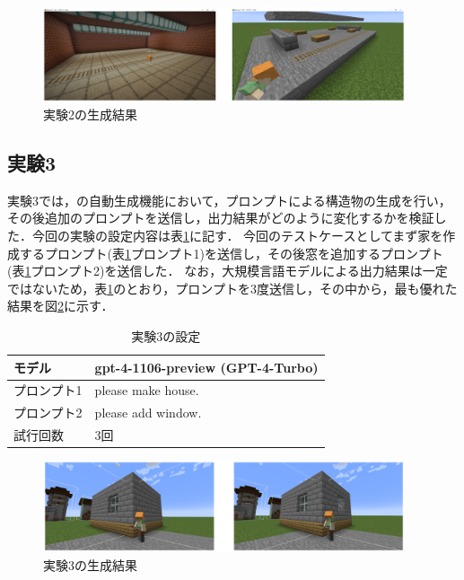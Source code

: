\begin{figure}[H]
    \centering
    \includegraphics[width=0.95\textwidth]{fig/train_station2.PNG}
    \caption{実験2の生成結果}
    \label{fig:station2}
\end{figure}

\subsection{実験3}\label{sec:ex3}
実験3では，{\mason}の自動生成機能において，プロンプトによる構造物の生成を行い，その後追加のプロンプトを送信し，出力結果がどのように変化するかを検証した．今回の実験の設定内容は表\ref{tab:setting3}に記す．
今回のテストケースとしてまず家を作成するプロンプト(表\ref{tab:setting3}プロンプト1)を送信し，その後窓を追加するプロンプト(表\ref{tab:setting3}プロンプト2)を送信した．
なお，大規模言語モデルによる出力結果は一定ではないため，表\ref{tab:setting3}のとおり，プロンプトを3度送信し，その中から，最も優れた結果を図\ref{fig:add_window}に示す．

\begin{table}[H]
    \caption{実験3の設定}\label{tab:setting3}
    \centering
    \begin{tabular}{ll}
        \hline \hline
        モデル & gpt-4-1106-preview (GPT-4-Turbo) \\
        \hline
        プロンプト1 & please make house. \\
        \hline
        プロンプト2 & please add window. \\
        \hline
        試行回数 & 3回 \\
        \hline
    \end{tabular}
\end{table}

\begin{figure}[H]
    \centering
    \includegraphics[width=0.95\textwidth]{fig/add_window.PNG}
    \caption{実験3の生成結果}
    \label{fig:add_window}
\end{figure}

